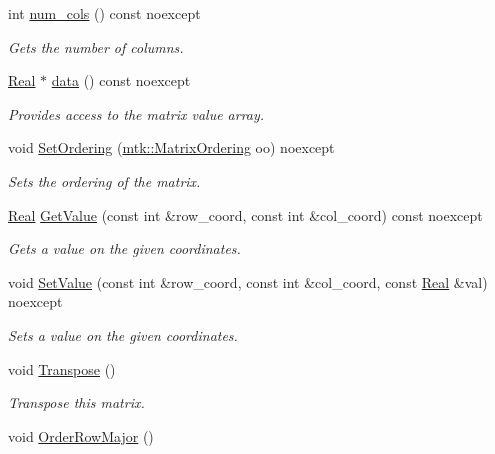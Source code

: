 \begin{DoxyCompactItemize}
int \hyperlink{classmtk_1_1DenseMatrix_a41747502d468c6728a4be31501b16e0e}{num\+\_\+cols} () const noexcept
\begin{DoxyCompactList}\small\item\em Gets the number of columns. \end{DoxyCompactList}\item 
\hyperlink{group__c01-roots_gac080bbbf5cbb5502c9f00405f894857d}{Real} $\ast$ \hyperlink{classmtk_1_1DenseMatrix_a0c33b8a9e01d157c61ddbdf807c25d84}{data} () const noexcept
\begin{DoxyCompactList}\small\item\em Provides access to the matrix value array. \end{DoxyCompactList}\item 
void \hyperlink{classmtk_1_1DenseMatrix_a178e63f365cf8c547dc5020c60357f5e}{Set\+Ordering} (\hyperlink{group__c02-enums_ga622801bd9f912d0f976c3e383f5f581c}{mtk\+::\+Matrix\+Ordering} oo) noexcept
\begin{DoxyCompactList}\small\item\em Sets the ordering of the matrix. \end{DoxyCompactList}\item 
\hyperlink{group__c01-roots_gac080bbbf5cbb5502c9f00405f894857d}{Real} \hyperlink{classmtk_1_1DenseMatrix_a4b23ecbebd970b5eea915dbb50691024}{Get\+Value} (const int \&row\+\_\+coord, const int \&col\+\_\+coord) const noexcept
\begin{DoxyCompactList}\small\item\em Gets a value on the given coordinates. \end{DoxyCompactList}\item 
void \hyperlink{classmtk_1_1DenseMatrix_a784ce5784109ac86bfb9d8562b334b13}{Set\+Value} (const int \&row\+\_\+coord, const int \&col\+\_\+coord, const \hyperlink{group__c01-roots_gac080bbbf5cbb5502c9f00405f894857d}{Real} \&val) noexcept
\begin{DoxyCompactList}\small\item\em Sets a value on the given coordinates. \end{DoxyCompactList}\item 
void \hyperlink{classmtk_1_1DenseMatrix_a71d9c07ca66e88d97d1fd5012f43138b}{Transpose} ()
\begin{DoxyCompactList}\small\item\em Transpose this matrix. \end{DoxyCompactList}\item 
void \hyperlink{classmtk_1_1DenseMatrix_ac2949efba3e8278335d45418c85433e4}{Order\+Row\+Major} ()

\end{DoxyCompactItemize}
